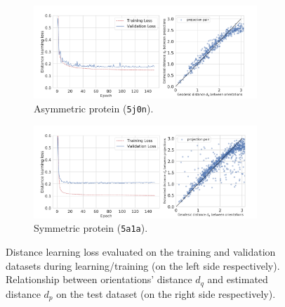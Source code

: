 \begin{figure}
    \centering
    \begin{subfigure}[t]{0.45\textwidth}
        \includegraphics[height=3.5cm]{figures/de_loss_dPdQ_5j0n.pdf}
        \caption{Asymmetric protein (\texttt{5j0n}).}
        \label{fig:losses-siamese-assym}
    \end{subfigure} \quad \quad
    \begin{subfigure}[t]{0.5\textwidth}
        \includegraphics[height=3.5cm]{figures/de_loss_dPdQ_5a1a.pdf}
        \caption{Symmetric protein (\texttt{5a1a}).}
        \label{fig:losses-siamese-sym}
    \end{subfigure}
    \caption{
        Distance learning loss  evaluated on the training and validation datasets during learning/training (on the left side respectively). Relationship between orientations' distance $d_q$ and estimated distance $d_p$ on the test dataset (on the right side respectively).
    }\label{fig:losses-siamese}
\end{figure}


